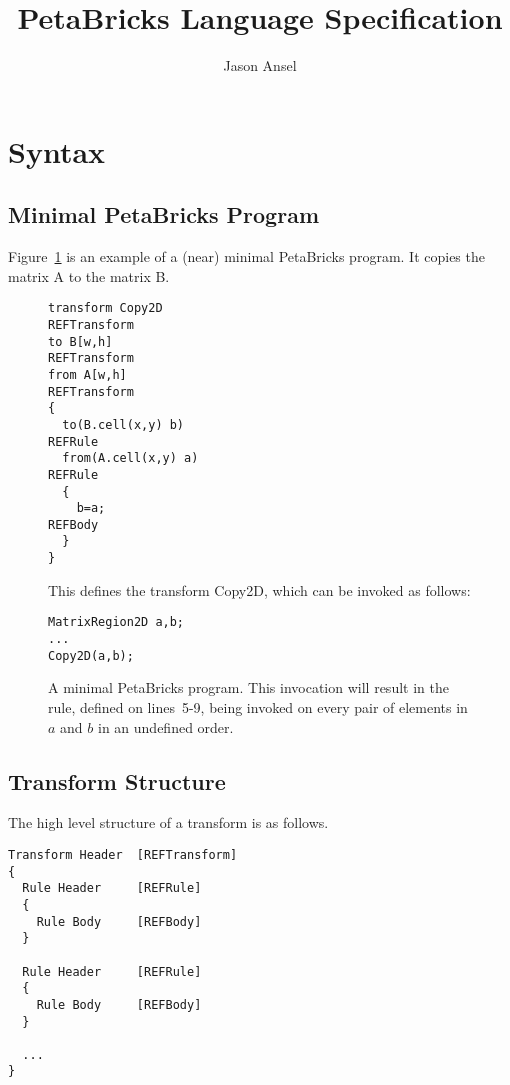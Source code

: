\documentclass[11pt]{article}
\begin{document}
\title{PetaBricks Language Specification}
\author{Jason Ansel}
\maketitle
\tableofcontents

\newpage
\section{Syntax}

\subsection{Minimal PetaBricks Program}

Figure~\ref{ex1} is an example of a (near) minimal PetaBricks program. It
copies the matrix A to the matrix B.

\begin{figure}[h]
\begin{lstlisting}
transform Copy2D                                                 REFTransform
to B[w,h]                                                        REFTransform
from A[w,h]                                                      REFTransform
{
  to(B.cell(x,y) b)                                              REFRule
  from(A.cell(x,y) a)                                            REFRule  
  {                                          
    b=a;                                                         REFBody
  }                                         
}
\end{lstlisting}
This defines the transform Copy2D, which can be invoked as follows:

\begin{lstlisting}
MatrixRegion2D a,b;
...
Copy2D(a,b);
\end{lstlisting}
  \caption{
  A minimal PetaBricks program.  This invocation will result in the rule,
  defined on lines~5-9, being invoked on every pair of elements in $a$
  and $b$ in an undefined order.
  \label{ex1}
  }
\end{figure}


\subsection{Transform Structure}

The high level structure of a transform is as follows.

\begin{lstlisting}
Transform Header  [REFTransform]
{
  Rule Header     [REFRule] 
  {                       
    Rule Body     [REFBody]
  }                      
  
  Rule Header     [REFRule] 
  {                       
    Rule Body     [REFBody]
  }                                         

  ...
}
\end{lstlisting}
\end{document}
